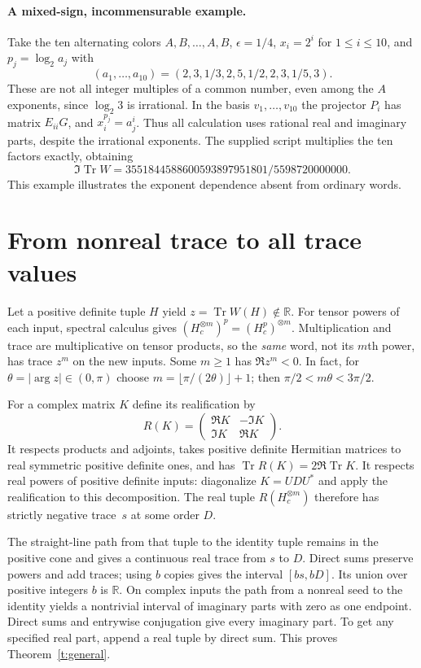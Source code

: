 \documentclass[11pt]{article}
\DeclareMathOperator{\Tr}{Tr}
\newcommand{\R}{\mathbb R}
\begin{document}
\paragraph{A mixed-sign, incommensurable example.}
Take the ten alternating colors $A,B,\ldots,A,B$, $\epsilon=1/4$, $x_i=2^i$ for $1\le i\le10$, and $p_j=\log_2 a_j$ with
\[
 (a_1,\ldots,a_{10})=(2,3,1/3,2,5,1/2,2,3,1/5,3).
\]
These are not all integer multiples of a common number, even among the $A$ exponents, since $\log_2 3$ is irrational. In the basis $v_1,\ldots,v_{10}$ the projector $P_i$ has matrix $E_{ii}G$, and $x_i^{p_j}=a_j^i$. Thus all calculation uses rational real and imaginary parts, despite the irrational exponents. The supplied script multiplies the ten factors exactly, obtaining
\[
 \Im\Tr W=3551844588600593897951801/5598720000000.
\]
This example illustrates the exponent dependence absent from ordinary words.

\section{From nonreal trace to all trace values}

Let a positive definite tuple $H$ yield $z=\Tr W(H)\notin\R$. For tensor powers of each input, spectral calculus gives $(H_c^{\otimes m})^{p}=(H_c^p)^{\otimes m}$. Multiplication and trace are multiplicative on tensor products, so the \emph{same} word, not its $m$th power, has trace $z^m$ on the new inputs. Some $m\ge1$ has $\Re z^m<0$. In fact, for $\theta=|\arg z|\in(0,\pi)$ choose $m=\lfloor\pi/(2\theta)\rfloor+1$; then $\pi/2<m\theta<3\pi/2$.

For a complex matrix $K$ define its realification by
\[
 R(K)=\begin{pmatrix}\Re K&-\Im K\\\Im K&\Re K\end{pmatrix}.
\]
It respects products and adjoints, takes positive definite Hermitian matrices to real symmetric positive definite ones, and has $\Tr R(K)=2\Re\Tr K$. It respects real powers of positive definite inputs: diagonalize $K=UDU^*$ and apply the realification to this decomposition. The real tuple $R(H_c^{\otimes m})$ therefore has strictly negative trace~$s$ at some order $D$.

The straight-line path from that tuple to the identity tuple remains in the positive cone and gives a continuous real trace from $s$ to $D$. Direct sums preserve powers and add traces; using $b$ copies gives the interval $[bs,bD]$. Its union over positive integers $b$ is $\R$. On complex inputs the path from a nonreal seed to the identity yields a nontrivial interval of imaginary parts with zero as one endpoint. Direct sums and entrywise conjugation give every imaginary part. To get any specified real part, append a real tuple by direct sum. This proves Theorem~\ref{t:general}.
\end{document}

